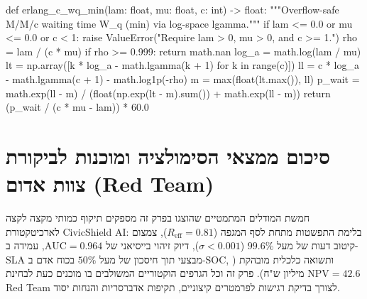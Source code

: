 \begin{ltrcode}[title={CivicShield AI -- Hardened Simulation Core (Python 3.11+ / NumPy)}]
def erlang_c_wq_min(lam: float, mu: float, c: int) -> float:
    """Overflow-safe M/M/c waiting time W_q (min) via log-space lgamma."""
    if lam <= 0.0 or mu <= 0.0 or c < 1:
        raise ValueError("Require lam > 0, mu > 0, and c >= 1.")
    rho = lam / (c * mu)
    if rho >= 0.999:
        return math.nan
    log_a = math.log(lam / mu)
    lt = np.array([k * log_a - math.lgamma(k + 1) for k in range(c)])
    ll = c * log_a - math.lgamma(c + 1) - math.log1p(-rho)
    m = max(float(lt.max()), ll)
    p_wait = math.exp(ll - m) / (float(np.exp(lt - m).sum()) + math.exp(ll - m))
    return (p_wait / (c * mu - lam)) * 60.0
\end{ltrcode}

\section{סיכום ממצאי הסימולציה ומוכנות לביקורת צוות אדום (\textenglish{Red Team})}
\label{sec:sim_summary}

חמשת המודלים המתמטיים שהוצגו בפרק זה מספקים תיקוף כמותי מקצה לקצה לארכיטקטורת \textenglish{CivicShield AI}: בלימת התפשטות מתחת לסף המגפה ($R_{\mathrm{eff}} = 0.81$), צמצום קיטוב דעות של מעל $99.6\%$ ($\sigma < 0.001$), דיוק זיהוי בייסיאני של $\text{AUC}=0.964$, עמידה ב-\textenglish{SLA} מבצעי תוך חיסכון של מעל $50\%$ בכוח אדם ב-\textenglish{SOC}, ותשואה כלכלית מובהקת ($\text{NPV} = 42.6$ מיליון ש"ח). פרק זה וכל הגרפים הוקטוריים המשולבים בו מוכנים כעת לבחינת \textenglish{Red Team} לצורך בדיקת רגישות לפרמטרים קיצוניים, תקיפות אדברסריות והנחות יסוד.
